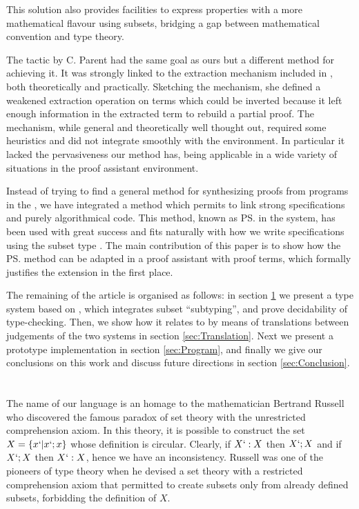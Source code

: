 \documentclass{llncs}
\begin{document}
This solution also provides %
facilities to express properties with a more mathematical flavour using subsets,
bridging a gap between mathematical convention and type theory. 

The \Program{} tactic by C. Parent \cite{conf/mpc/Parent95} had the same
goal as ours but a different method for achieving it. It was strongly
linked to the extraction mechanism included in \Coq, both theoretically
and practically. Sketching the mechanism, she defined a weakened
extraction operation on \CIC{} terms which could be inverted because it left enough
information in the extracted term to rebuild a partial proof. The
mechanism, while general and theoretically well thought out, required
some heuristics and did not integrate smoothly with the \Coq{}
environment. In particular it lacked the pervasiveness our method has,
being applicable in a wide variety of situations in the proof assistant
environment.


Instead of trying to find a general method for synthesizing proofs from
programs in the \CICfull, we have integrated a method which permits to
link strong specifications and purely algorithmical code. This method,
known as \ps{} in the \PVS{} system, has been used with great success and
fits naturally with how we write specifications using the subset type \cite{progmartinlof}.
The main contribution of this paper is to show how the \ps{} method 
can be adapted in a proof assistant with proof terms, which formally 
justifies the extension in the first place.

The remaining of the article is organised as follows: in section \ref{sec:Russell} we present a
type system based on \CIC, which integrates subset ``subtyping'', and
prove decidability of type-checking. Then, we show how it relates to
\CIC{} by means of translations between
judgements of the two systems in section \ref{sec:Translation}. Next we present a prototype
implementation in section \ref{sec:Program}, and finally we give our
conclusions on this work and discuss future directions in section \ref{sec:Conclusion}.

\section{\Russell{}}
\label{sec:Russell}
The name of our language is an homage to the mathematician Bertrand Russell who
discovered the famous paradox of set theory with the unrestricted
comprehension axiom. In this theory, it is possible to construct the set
$X = \{x `| x `; x\}$ whose definition is circular. Clearly, if $X `: X$
then $X `; X$ and if $X `; X$ then $X `: X$, hence we have an
inconsistency. Russell was one of the pioneers of type theory when he
devised a set theory with a restricted comprehension axiom that
permitted to create subsets only from already defined subsets,
forbidding the definition of $X$. %
\end{document}
